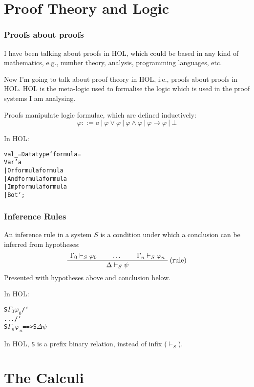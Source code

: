 \documentclass[english,svgnames,hide notes,12pt]{beamer}
\theoremstyle{definition}
\theoremstyle{remark}
\begin{document}
\section{Proof Theory and Logic}

\begin{frame}
    \frametitle{Proofs about proofs}
    I have been talking about proofs in HOL, which could be based in any kind of mathematics, e.g., number theory, analysis, programming languages, etc. 
    
    \bigskip
    Now I'm going to talk about proof theory in HOL, i.e., proofs about proofs in HOL. HOL is the meta-logic used to formalise the logic which is used in the proof systems I am analysing.  
\end{frame}

\begin{frame}[fragile]
    Proofs manipulate logic formulae, which are defined inductively:
    \[ \varphi ::= a~|~\varphi \lor \varphi~|~\varphi \land \varphi~|~\varphi \to \varphi~|~\bot \]

    \bigskip
    In HOL:
    \small
\begin{alltt}
val _ = Datatype `formula =
    Var 'a
    | Or formula formula
    | And formula formula
    | Imp formula formula
    | Bot`;
\end{alltt}
\end{frame}

\newcommand{\bs}{\char`\\}
\begin{frame}[fragile]
    \frametitle{Inference Rules}
    An inference rule in a system $S$ is a condition under which a conclusion can be inferred from hypotheses:
    \[
        \AxiomC{$\Gamma_0 \vdash_S \varphi_0$}
        \AxiomC{$\dots$}
        \AxiomC{$\Gamma_n \vdash_S \varphi_n$}  
        \RightLabel{(rule)}
        \TrinaryInfC{$\Delta \vdash_S \psi$}
        \DisplayProof
    \]
    Presented with hypotheses above and conclusion below.

    \bigskip
    In HOL:
    \begin{alltt}
        S \(\Gamma_0\) \(\varphi_0\) /\bs{} ... /\bs{} S \(\Gamma_n\) \(\varphi_n\) ==> S \(\Delta\) \(\psi\)
    \end{alltt}

    In HOL, \texttt{S} is a prefix binary relation, instead of infix ($\vdash_S$).
\end{frame}

\section{The Calculi}
\end{document}
